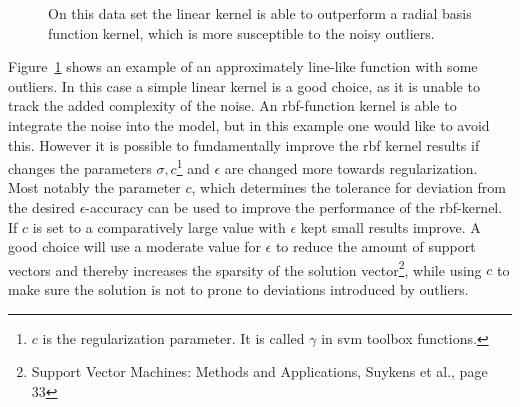 \begin{figure}
\centering


\caption{On this data set the linear kernel is able to outperform a radial basis function kernel, which is more susceptible to the noisy outliers.}
\label{fig:linearKing}
\end{figure}
Figure~\ref{fig:linearKing} shows an example of an approximately line-like function with some outliers. In this case a simple linear kernel is a good choice, as it is unable to track the added complexity of the noise. An rbf-function kernel is able to integrate the noise into the model, but in this example one would like to avoid this. However it is possible to fundamentally improve the rbf kernel results if changes the parameters $\sigma, c$\footnote{$c$ is the regularization parameter. It is called $\gamma$ in svm toolbox functions.} and $\epsilon$ are changed more towards regularization. Most notably the parameter $c$, which determines the tolerance for deviation from the desired $\epsilon$-accuracy can be used to improve the performance of the rbf-kernel. If $c$ is set to a comparatively large value with $\epsilon$ kept small results improve. A good choice will use a moderate value for $\epsilon$ to reduce the amount of support vectors and thereby increases the sparsity of the solution vector\footnote{Support Vector Machines: Methods and Applications, Suykens et al., page 33}, while using $c$ to make sure the solution is not to prone to deviations introduced by outliers.
 
